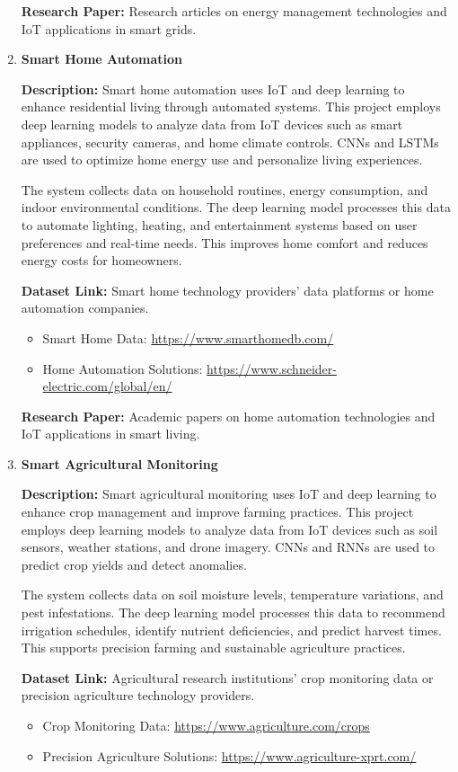 \documentclass{article}
\begin{document}
\begin{enumerate}[label=\textbf{\arabic*.}, leftmargin=*]
\textbf{Research Paper:} Research articles on energy management technologies and IoT applications in smart grids.

\item \textbf{Smart Home Automation}

\textbf{Description:}
Smart home automation uses IoT and deep learning to enhance residential living through automated systems. This project employs deep learning models to analyze data from IoT devices such as smart appliances, security cameras, and home climate controls. CNNs and LSTMs are used to optimize home energy use and personalize living experiences.

The system collects data on household routines, energy consumption, and indoor environmental conditions. The deep learning model processes this data to automate lighting, heating, and entertainment systems based on user preferences and real-time needs. This improves home comfort and reduces energy costs for homeowners.

\textbf{Dataset Link:} Smart home technology providers' data platforms or home automation companies.
\begin{itemize}
    \item Smart Home Data: \url{https://www.smarthomedb.com/}
    \item Home Automation Solutions: \url{https://www.schneider-electric.com/global/en/}
\end{itemize}

\textbf{Research Paper:} Academic papers on home automation technologies and IoT applications in smart living.

\item \textbf{Smart Agricultural Monitoring}

\textbf{Description:}
Smart agricultural monitoring uses IoT and deep learning to enhance crop management and improve farming practices. This project employs deep learning models to analyze data from IoT devices such as soil sensors, weather stations, and drone imagery. CNNs and RNNs are used to predict crop yields and detect anomalies.

The system collects data on soil moisture levels, temperature variations, and pest infestations. The deep learning model processes this data to recommend irrigation schedules, identify nutrient deficiencies, and predict harvest times. This supports precision farming and sustainable agriculture practices.

\textbf{Dataset Link:} Agricultural research institutions' crop monitoring data or precision agriculture technology providers.
\begin{itemize}
    \item Crop Monitoring Data: \url{https://www.agriculture.com/crops}
    \item Precision Agriculture Solutions: \url{https://www.agriculture-xprt.com/}
\end{itemize}


\end{enumerate}
\end{document}
